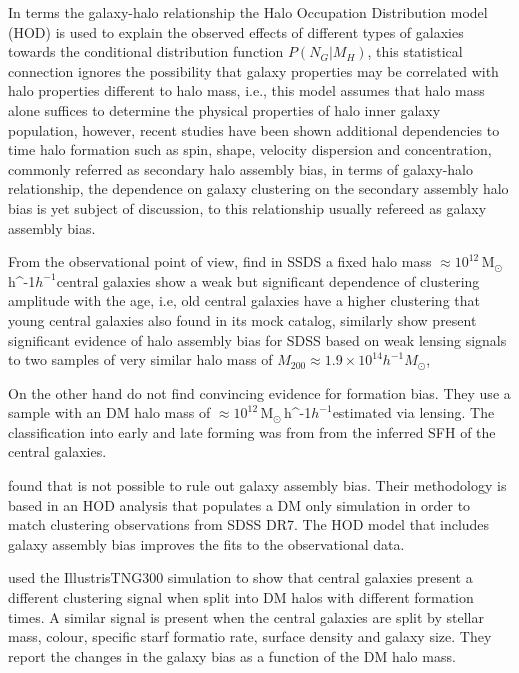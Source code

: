 \documentclass[fleqn,usenatbib]{mnras}
\newcommand{\Msunh}{\,{\rm M}$_{\odot}$\,\ifmmode h^{-1}\else $h^{-1}$\fi}
\begin{document}
In terms the galaxy-halo relationship the Halo Occupation Distribution
model (HOD) is used to explain the observed effects of different types
of galaxies towards the conditional distribution function
$P(N_G|M_H)$, this statistical connection ignores the possibility that
galaxy properties may be correlated with halo properties different to
halo mass, i.e., this model assumes that halo mass alone suffices to
determine the physical properties of halo inner galaxy population,
however, recent studies have been shown additional dependencies to
time halo formation such as spin, shape, velocity dispersion and
concentration, commonly referred as secondary halo assembly bias, in
terms of galaxy-halo relationship, the dependence on galaxy clustering
on the secondary assembly halo bias is yet subject of discussion, to
this relationship usually refereed as galaxy assembly bias. 

From the observational point of view, \citet{Lacerna_2014} find in
SSDS a fixed halo mass $\approx 10^{12}$\Msunh central
galaxies show a weak but significant dependence of clustering
amplitude with the age, i.e, old central galaxies have a higher
clustering that young central galaxies also found in its mock catalog,
similarly \citet{2016PhRvL.116d1301M} show present significant
evidence of halo assembly bias for SDSS based on weak lensing signals
to two samples of very similar halo mass of $M_{200}\approx 1.9\times
10^{14}h^{-1}M_\odot$, 


On the other hand \citet{2016ApJ...819..119L} do not find convincing
evidence for formation bias. They use a sample with an DM
halo mass of $\approx 10^{12}$\Msunh estimated via lensing. The
classification into early and late forming was from from the inferred
SFH of the central galaxies.

\citet{2019MNRAS.485.1196Z} found that is not possible to rule out
galaxy assembly bias. Their methodology is based in an HOD analysis
that populates a DM only simulation in order to match clustering
observations from SDSS DR7. The HOD model that includes galaxy
assembly bias improves the fits to the observational data.

\cite{2020MNRAS.tmp.1844M} used the IllustrisTNG300 simulation to show
that central galaxies present a different clustering signal when split
into DM halos with different formation times. 
A similar signal is present when the central galaxies are split by
stellar mass, colour, specific starf formatio rate, surface density
and galaxy size. 
They report the changes in the galaxy bias as a function of the DM
halo mass.
\end{document}
